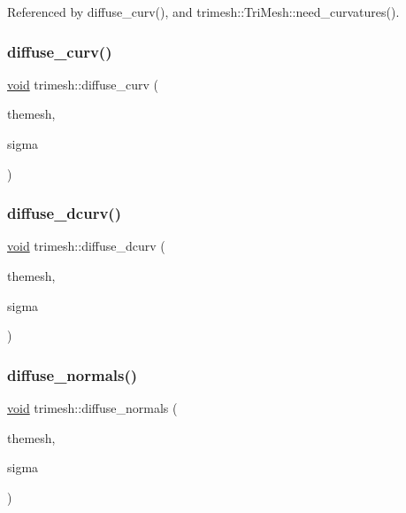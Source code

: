 Referenced by diffuse\+\_\+curv(), and trimesh\+::\+Tri\+Mesh\+::need\+\_\+curvatures().

\mbox{\label{namespacetrimesh_a3985e4c8a4cb1fcaebc0a6edffcd58bb}} 
\subsubsection{\texorpdfstring{diffuse\+\_\+curv()}{diffuse\_curv()}}
{\footnotesize\ttfamily \hyperlink{namespacetrimesh_a784ddfd979e1c579bda795a8edfc3f43}{void} trimesh\+::diffuse\+\_\+curv (\begin{DoxyParamCaption}\item[{\hyperlink{classtrimesh_1_1TriMesh}{Tri\+Mesh} $\ast$}]{themesh,  }\item[{float}]{sigma }\end{DoxyParamCaption})}

\mbox{\label{namespacetrimesh_ab0d66915ca4f2f71c7726947463fe36d}} 
\subsubsection{\texorpdfstring{diffuse\+\_\+dcurv()}{diffuse\_dcurv()}}
{\footnotesize\ttfamily \hyperlink{namespacetrimesh_a784ddfd979e1c579bda795a8edfc3f43}{void} trimesh\+::diffuse\+\_\+dcurv (\begin{DoxyParamCaption}\item[{\hyperlink{classtrimesh_1_1TriMesh}{Tri\+Mesh} $\ast$}]{themesh,  }\item[{float}]{sigma }\end{DoxyParamCaption})}

\mbox{\label{namespacetrimesh_ad8505186d2e0e0ffff60dbb77ad9be8d}} 
\subsubsection{\texorpdfstring{diffuse\+\_\+normals()}{diffuse\_normals()}}
{\footnotesize\ttfamily \hyperlink{namespacetrimesh_a784ddfd979e1c579bda795a8edfc3f43}{void} trimesh\+::diffuse\+\_\+normals (\begin{DoxyParamCaption}\item[{\hyperlink{classtrimesh_1_1TriMesh}{Tri\+Mesh} $\ast$}]{themesh,  }\item[{float}]{sigma }\end{DoxyParamCaption})}



